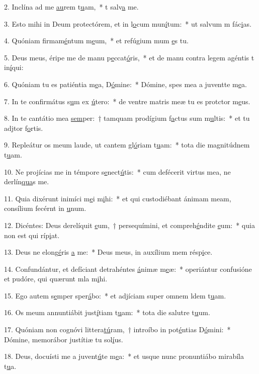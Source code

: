2. Inclína ad me \uline{au}rem t\uline{u}am,~* t salv\uline{a} me.\par 
3. Esto mihi in Deum protectórem, et in l\uline{o}cum mun\uline{í}tum:~* ut salvum m fác\uline{i}as.\par 
4. Quóniam firmam\uline{é}ntum m\uline{e}um,~* et refúgium mum \uline{e}s tu.\par 
5. Deus meus, éripe me de manu p\uline{e}ccat\uline{ó}ris,~* et de manu contra legem agéntis t in\uline{í}qui:\par 
6. Quóniam tu es patiéntia m\uline{e}a, D\uline{ó}mine:~* Dómine, spes mea a juventte m\uline{e}a.\par 
7. In te confirmátus s\uline{u}m ex \uline{ú}tero:~* de ventre matris meæ tu es protctor m\uline{e}us.\par 
8. In te cantátio mea \uline{sem}per:~† tamquam prodígium f\uline{a}ctus sum m\uline{u}ltis:~* et tu adjtor f\uline{o}rtis.\par 
9. Repleátur os meum laude, ut cantem gl\uline{ó}riam t\uline{u}am:~* tota die magnitúdnem t\uline{u}am.\par 
10. Ne projícias me in témpore s\uline{e}nect\uline{ú}tis:~* cum defécerit virtus mea, ne derlín\uline{qua}s me.\par 
11. Quia dixérunt inimíci m\uline{e}i m\uline{i}hi:~* et qui custodiébant ánimam meam, consílium fecérnt in \uline{u}num.\par 
12. Dicéntes: Deus derelíquit \uline{e}um,~† persequímini, et compreh\uline{é}ndite \uline{e}um:~* quia non est qui ríp\uline{i}at.\par 
13. Deus ne elong\uline{é}ris \uline{a} me:~* Deus meus, in auxílium mem résp\uline{i}ce.\par 
14. Confundántur, et defíciant detrahéntes \uline{á}nimæ m\uline{e}æ:~* operiántur confusióne et pudóre, qui quærunt mla m\uline{i}hi.\par 
15. Ego autem s\uline{e}mper sper\uline{á}bo:~* et adjíciam super omnem ldem t\uline{u}am.\par 
16. Os meum annuntiábit just\uline{í}tiam t\uline{u}am:~* tota die salutre t\uline{u}um.\par 
17. Quóniam non cognóvi littera\uline{tú}ram,~† introíbo in pot\uline{é}ntias D\uline{ó}mini:~* Dómine, memorábor justítiæ tu sol\uline{í}us.\par 
18. Deus, docuísti me a juvent\uline{ú}te m\uline{e}a:~* et usque nunc pronuntiábo mirabíla t\uline{u}a.\par 
